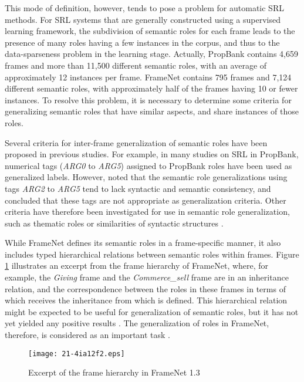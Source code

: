 \documentclass[english]{jnlp_1.4_rep}
\begin{document}
This mode of definition, however, tends to pose a problem for automatic SRL methods. For SRL systems that are generally constructed using a supervised learning framework, the subdivision of semantic roles for each frame leads to the presence of many roles having a few instances in the corpus, and thus to the data-sparseness problem in the learning stage. Actually, PropBank contains 4,659 frames and more than 11,500 different semantic roles, with an average of approximately 12 instances per frame. FrameNet contains 795 frames and 7,124 different semantic roles, with approximately half of the frames having 10 or fewer instances. To resolve this problem, it is necessary to determine some criteria for generalizing semantic roles that have similar aspects, and share instances of those roles.

Several criteria for inter-frame generalization of semantic roles have been proposed in previous studies. For example, in many studies on SRL in PropBank, numerical tags ({\it ARG0} to {\it ARG5}) assigned to PropBank roles have been used as generalized labels. However,  noted that the semantic role generalizations using tags {\it ARG2} to {\it ARG5} tend to lack syntactic and semantic consistency, and concluded that these tags are not appropriate as generalization criteria. Other criteria have therefore been investigated for use in semantic role generalization, such as thematic roles or similarities of syntactic structures \cite{gordon-swanson:2007:ACLMain,zapirain-agirre-marquez:2008:ACLMain}.

While FrameNet defines its semantic roles in a frame-specific manner, it also includes typed hierarchical relations between semantic roles within frames. Figure \ref{fig:frame-hierarchy} illustrates an excerpt from the frame hierarchy of FrameNet, where, for example, the {\it Giving} frame and the {\it Commerce\_sell} frame are in an inheritance relation, and the correspondence between the roles in these frames in terms of which receives the inheritance from which is defined. This hierarchical relation might be expected to be useful for generalization of semantic roles, but it has not yet yielded any positive results \cite{Baldewein2004}. The generalization of roles in FrameNet, therefore, is considered as an important task .

\begin{figure}[b]
\vspace{-0.5\Cvs}
\begin{center}
\texttt{[image: 21-4ia12f2.eps]}
\end{center}
\caption{Excerpt of the frame hierarchy in FrameNet 1.3}
\label{fig:frame-hierarchy}
\end{figure}
\end{document}
